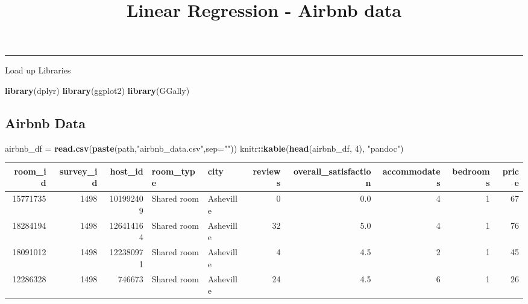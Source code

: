 \documentclass[]{article}
\title{Linear Regression - Airbnb data}
\author{}
\date{}
\newenvironment{Shaded}{\begin{snugshade}}{\end{snugshade}}
\newcommand{\DataTypeTok}[1]{\textcolor[rgb]{0.13,0.29,0.53}{#1}}
\newcommand{\DecValTok}[1]{\textcolor[rgb]{0.00,0.00,0.81}{#1}}
\newcommand{\KeywordTok}[1]{\textcolor[rgb]{0.13,0.29,0.53}{\textbf{#1}}}
\newcommand{\NormalTok}[1]{#1}
\newcommand{\OperatorTok}[1]{\textcolor[rgb]{0.81,0.36,0.00}{\textbf{#1}}}
\newcommand{\StringTok}[1]{\textcolor[rgb]{0.31,0.60,0.02}{#1}}
\begin{document}
\maketitle

\begin{center}\rule{0.5\linewidth}{\linethickness}\end{center}

Load up Libraries

\begin{Shaded}
\begin{Highlighting}[]
\KeywordTok{library}\NormalTok{(dplyr)}
\KeywordTok{library}\NormalTok{(ggplot2)}
\KeywordTok{library}\NormalTok{(GGally)}
\end{Highlighting}
\end{Shaded}

\hypertarget{airbnb-data}{%
\subsection{Airbnb Data}\label{airbnb-data}}

\begin{Shaded}
\begin{Highlighting}[]
\NormalTok{airbnb_df =}\StringTok{ }\KeywordTok{read.csv}\NormalTok{(}\KeywordTok{paste}\NormalTok{(path,}\StringTok{"airbnb_data.csv"}\NormalTok{,}\DataTypeTok{sep=}\StringTok{""}\NormalTok{))}
\NormalTok{knitr}\OperatorTok{::}\KeywordTok{kable}\NormalTok{(}\KeywordTok{head}\NormalTok{(airbnb_df, }\DecValTok{4}\NormalTok{), }\StringTok{"pandoc"}\NormalTok{)}
\end{Highlighting}
\end{Shaded}

\begin{longtable}[]{@{}rrrllrrrrr@{}}
\toprule
room\_id & survey\_id & host\_id & room\_type & city & reviews &
overall\_satisfaction & accommodates & bedrooms & price\tabularnewline
\midrule
\endhead
15771735 & 1498 & 101992409 & Shared room & Asheville & 0 & 0.0 & 4 & 1
& 67\tabularnewline
18284194 & 1498 & 126414164 & Shared room & Asheville & 32 & 5.0 & 4 & 1
& 76\tabularnewline
18091012 & 1498 & 122380971 & Shared room & Asheville & 4 & 4.5 & 2 & 1
& 45\tabularnewline
12286328 & 1498 & 746673 & Shared room & Asheville & 24 & 4.5 & 6 & 1 &
26\tabularnewline
\bottomrule
\end{longtable}
\end{document}
